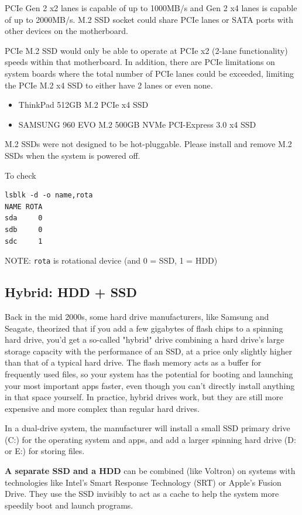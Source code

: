 PCIe Gen 2 x2 lanes is capable of up to 1000MB/s and Gen 2 x4 lanes is capable
of up to 2000MB/s. M.2 SSD socket could share PCIe lanes or SATA ports with
other devices on the motherboard.

PCIe M.2 SSD would only be able to operate at PCIe x2 (2-lane functionality)
speeds within that motherboard. In addition, there are PCIe limitations on
system boards where the total number of PCIe lanes could be exceeded, limiting
the PCIe M.2 x4 SSD to either have 2 lanes or even none.
\begin{itemize}
  \item  ThinkPad 512GB M.2 PCIe x4 SSD
  \item SAMSUNG 960 EVO M.2 500GB NVMe PCI-Express 3.0 x4 SSD
\end{itemize}
M.2 SSDs were not designed to be hot-pluggable. Please install and remove
M.2 SSDs when the system is powered off.


To check 
\begin{verbatim}
lsblk -d -o name,rota
NAME ROTA
sda     0
sdb     0
sdc     1
\end{verbatim}
NOTE: \verb!rota! is rotational device (and 0 = SSD, 1 = HDD)


\subsection{Hybrid: HDD + SSD}

Back in the mid 2000s, some hard drive manufacturers, like Samsung and Seagate,
theorized that if you add a few gigabytes of flash chips to a spinning hard
drive, you'd get a so-called "hybrid" drive combining a hard drive's large
storage capacity with the performance of an SSD, at a price only slightly higher
than that of a typical hard drive. The flash memory acts as a buffer for
frequently used files, so your system has the potential for booting and
launching your most important apps faster, even though you can't directly
install anything in that space yourself. In practice, hybrid drives work, but
they are still more expensive and more complex than regular hard drives.


In a dual-drive system, the manufacturer will install a small SSD primary drive
(C:) for the operating system and apps, and add a larger spinning hard drive (D:
or E:) for storing files.

{\bf A separate SSD and a HDD} can be combined (like Voltron) on systems
with technologies like Intel's Smart Response Technology (SRT) or Apple's Fusion
Drive. They use the SSD invisibly to act as a cache to help the system more
speedily boot and launch programs.



